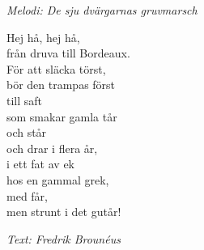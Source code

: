 {\footnotesize\textit{Melodi: De sju dvärgarnas gruvmarsch}}\par
\vspace{10pt}
Hej hå, hej hå,\\
från druva till Bordeaux.\\
För att släcka törst,\\
bör den trampas först\\
till saft\\
som smakar gamla tår\\
och står\\
och drar i flera år,\\
i ett fat av ek\\
hos en gammal grek,\\
med får,\\
men strunt i det gutår!
\par
\vspace{10pt}
{\footnotesize\textit{Text: Fredrik Brounéus}}
